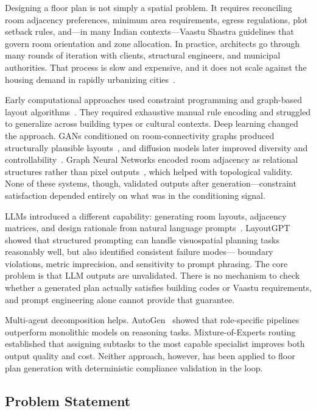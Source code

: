 \documentclass[journal]{IEEEtran}
\begin{document}
Designing a floor plan is not simply a spatial problem. It requires
reconciling room adjacency preferences, minimum area requirements, egress
regulations, plot setback rules, and---in many Indian contexts---Vaastu
Shastra guidelines that govern room orientation and zone allocation. In
practice, architects go through many rounds of iteration with clients,
structural engineers, and municipal authorities. That process is slow
and expensive, and it does not scale against the housing demand in rapidly
urbanizing cities~\cite{b1}.

Early computational approaches used constraint programming and graph-based
layout algorithms~\cite{b2}. They required exhaustive manual rule encoding and
struggled to generalize across building types or cultural contexts. Deep
learning changed the approach. GANs conditioned on room-connectivity graphs
produced structurally plausible layouts~\cite{b3}, and diffusion models later
improved diversity and controllability~\cite{b4}. Graph Neural Networks encoded
room adjacency as relational structures rather than pixel outputs~\cite{b5},
which helped with topological validity. None of these systems, though,
validated outputs after generation---constraint satisfaction depended entirely
on what was in the conditioning signal.

LLMs introduced a different capability: generating room layouts, adjacency
matrices, and design rationale from natural language prompts~\cite{b6}.
LayoutGPT~\cite{b7} showed that structured prompting can handle visuospatial
planning tasks reasonably well, but also identified consistent failure modes---
boundary violations, metric imprecision, and sensitivity to prompt phrasing.
The core problem is that LLM outputs are unvalidated. There is no mechanism
to check whether a generated plan actually satisfies building codes or Vaastu
requirements, and prompt engineering alone cannot provide that guarantee.

Multi-agent decomposition helps. AutoGen~\cite{b8} showed that role-specific
pipelines outperform monolithic models on reasoning tasks. Mixture-of-Experts
routing~\cite{b9}\cite{b10} established that assigning subtasks to the most
capable specialist improves both output quality and cost. Neither approach,
however, has been applied to floor plan generation with deterministic
compliance validation in the loop.

\subsection{Problem Statement}
\end{document}
